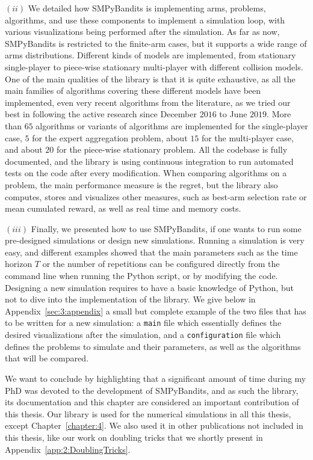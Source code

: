 $(ii)$
We detailed how SMPyBandits is implementing arms, problems, algorithms, and use these components to implement a simulation loop, with various visualizations being performed after the simulation.
As far as now, SMPyBandits is restricted to the finite-arm cases, but it supports a wide range of arms distributions.
Different kinds of models are implemented, from stationary single-player to piece-wise stationary multi-player with different collision models.
One of the main qualities of the library is that it is quite exhaustive, as all the main families of algorithms covering these different models have been implemented, even very recent algorithms from the literature, as we tried our best in following the active research since December $2016$ to June $2019$.
More than $65$ algorithms or variants of algorithms are implemented for the single-player case, $5$ for the expert aggregation problem, about $15$ for the multi-player case, and about $20$ for the piece-wise stationary problem.
All the codebase is fully documented, and the library is using continuous integration to run automated tests on the code after every modification.
%
When comparing algorithms on a problem, the main performance measure is the regret, but the library also computes, stores and visualizes other measures, such as best-arm selection rate or mean cumulated reward, as well as real time and memory costs.

$(iii)$
Finally, we presented how to use SMPyBandits, if one wants to run some pre-designed simulations or design new simulations.
Running a simulation is very easy, and different examples showed that the main parameters such as the time horizon $T$ or the number of repetitions can be configured directly from the command line when running the Python script, or by modifying the code.
Designing a new simulation requires to have a basic knowledge of Python, but not to dive into the implementation of the library.
We give below in Appendix~\ref{sec:3:appendix} a small but complete example of the two files that has to be written for a new simulation: a \texttt{main} file which essentially defines the desired visualizations after the simulation, and a \texttt{configuration} file which defines the problems to simulate and their parameters, as well as the algorithms that will be compared.


We want to conclude by highlighting that a significant amount of time during my PhD was devoted to the development of SMPyBandits, and as such the library, its documentation and this chapter  are considered an important contribution of this thesis.
%
Our library is used for the numerical simulations in all this thesis, except Chapter~\ref{chapter:4}.
We also used it in other publications not included in this thesis, like our work on doubling tricks \cite{Besson2018DoublingTricks} that we shortly present in Appendix~\ref{app:2:DoublingTricks}.


